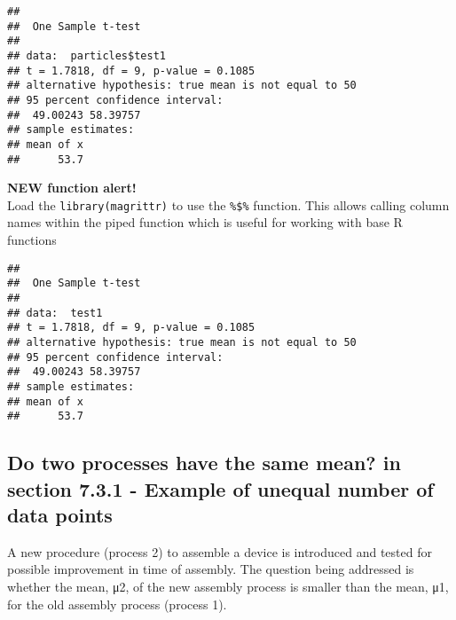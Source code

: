 \documentclass[]{book}
\newenvironment{Shaded}{\begin{snugshade}}{\end{snugshade}}
\newcommand{\CommentTok}[1]{\textcolor[rgb]{0.56,0.35,0.01}{\textit{#1}}}
\newcommand{\DataTypeTok}[1]{\textcolor[rgb]{0.13,0.29,0.53}{#1}}
\newcommand{\DecValTok}[1]{\textcolor[rgb]{0.00,0.00,0.81}{#1}}
\newcommand{\FloatTok}[1]{\textcolor[rgb]{0.00,0.00,0.81}{#1}}
\newcommand{\KeywordTok}[1]{\textcolor[rgb]{0.13,0.29,0.53}{\textbf{#1}}}
\newcommand{\NormalTok}[1]{#1}
\newcommand{\OperatorTok}[1]{\textcolor[rgb]{0.81,0.36,0.00}{\textbf{#1}}}
\newcommand{\StringTok}[1]{\textcolor[rgb]{0.31,0.60,0.02}{#1}}
\theoremstyle{definition}
\theoremstyle{definition}
\theoremstyle{definition}
\theoremstyle{remark}
\begin{document}
\begin{verbatim}
## 
##  One Sample t-test
## 
## data:  particles$test1
## t = 1.7818, df = 9, p-value = 0.1085
## alternative hypothesis: true mean is not equal to 50
## 95 percent confidence interval:
##  49.00243 58.39757
## sample estimates:
## mean of x 
##      53.7
\end{verbatim}

\textbf{NEW function alert!}\\
Load the \texttt{library(magrittr)} to use the \texttt{\%\$\%} function.
This allows calling column names within the piped function which is
useful for working with base R functions

\begin{Shaded}
\end{Shaded}

\begin{verbatim}
## 
##  One Sample t-test
## 
## data:  test1
## t = 1.7818, df = 9, p-value = 0.1085
## alternative hypothesis: true mean is not equal to 50
## 95 percent confidence interval:
##  49.00243 58.39757
## sample estimates:
## mean of x 
##      53.7
\end{verbatim}

\hypertarget{do-two-processes-have-the-same-mean-in-section-7.3.1---example-of-unequal-number-of-data-points}{%
\subsection{Do two processes have the same mean? in section 7.3.1 -
Example of unequal number of data
points}\label{do-two-processes-have-the-same-mean-in-section-7.3.1---example-of-unequal-number-of-data-points}}

A new procedure (process 2) to assemble a device is introduced and
tested for possible improvement in time of assembly. The question being
addressed is whether the mean, μ2, of the new assembly process is
smaller than the mean, μ1, for the old assembly process (process 1).
\end{document}

